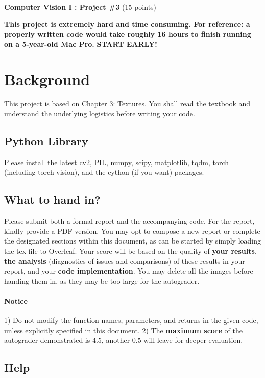 \documentclass[11pt]{article}
\begin{document}
{\centering \textbf{Computer Vision I : Project \#3} (15 points)\par} 


\textbf{This project is} \textbf{\textcolor{color-C00000}{extremely}} \textbf{hard and time consuming. For reference: a properly written code would take roughly 16 hours to finish running on a 5-year-old Mac Pro.} \textbf{\textcolor{color-C00000}{START EARLY!}} 

\section{Background} 

This project is based on Chapter 3: Textures. You shall read the textbook and understand the underlying logistics before writing your code.

\subsection{Python Library}

Please install the latest cv2, PIL, numpy, scipy, matplotlib, tqdm, torch (including torch-vision), and the cython (if you want) packages. 
\color{black}

\subsection{What to hand in?}

Please submit both a formal report and the accompanying code. For the report, kindly provide a PDF version. You may opt to compose a new report or complete the designated sections within this document, as can be started by simply loading the tex file to Overleaf. Your score will be based on the quality of \textbf{your results}, \textbf{the analysis} (diagnostics of issues and comparisons) of these results in your report, and your \textbf{code implementation}. You may delete all the images before handing them in, as they may be too large for the autograder.

\paragraph{Notice}
1) Do not modify the function names, parameters, and returns in the given code, unless explicitly specified in this document. 2) The \textbf{maximum score} of the autograder demonstrated is $4.5$, another $0.5$ will leave for deeper evaluation. 

\subsection{Help}
\end{document}
